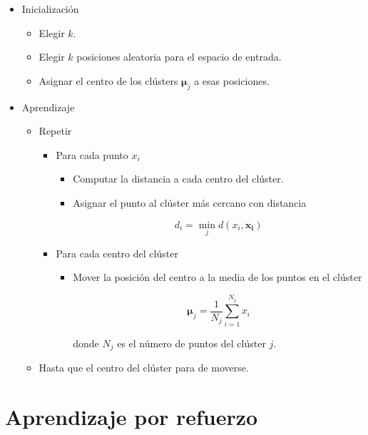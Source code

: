 \begin{itemize}
\item Inicialización

\begin{itemize}
\item Elegir $k$.
\item Elegir $k$ posiciones aleatoria para el espacio de entrada.
\item Asignar el centro de los clústers $\mathbf{\mu}_j$ a esas posiciones.
\end{itemize}

\item Aprendizaje

\begin{itemize}
\item Repetir

\begin{itemize}
\item Para cada punto $x_i$

\begin{itemize}
\item Computar la distancia a cada centro del clúster.
\item Asignar el punto al clúster más cercano con distancia

\begin{equation}
d_i = \min_j d(x_i, \mathbf{x_i})
\end{equation}
\end{itemize}

\item Para cada centro del clúster

\begin{itemize}
\item Mover la posición del centro a la media de los puntos en el clúster

\begin{equation}
\mathbf{\mu}_j = \dfrac{1}{N_j} \sum_{i=1}^{N_j} x_i
\end{equation}

donde $N_j$ es el número de puntos del clúster $j$.
\end{itemize}

\end{itemize}

\item Hasta que el centro del clúster para de moverse.

\end{itemize}

\end{itemize}  

\section{Aprendizaje por refuerzo}

